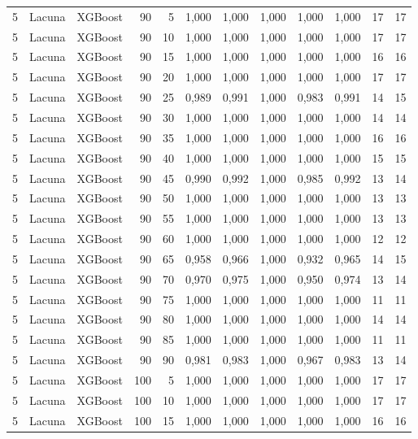 \begin{longtable}{@{}rllrrrrrrrrr@{}}
5 & Lacuna & XGBoost & 90 & 5 & 1,000 & 1,000 & 1,000 & 1,000 & 1,000 & 17 & 17 \\
5 & Lacuna & XGBoost & 90 & 10 & 1,000 & 1,000 & 1,000 & 1,000 & 1,000 & 17 & 17 \\
5 & Lacuna & XGBoost & 90 & 15 & 1,000 & 1,000 & 1,000 & 1,000 & 1,000 & 16 & 16 \\
5 & Lacuna & XGBoost & 90 & 20 & 1,000 & 1,000 & 1,000 & 1,000 & 1,000 & 17 & 17 \\
5 & Lacuna & XGBoost & 90 & 25 & 0,989 & 0,991 & 1,000 & 0,983 & 0,991 & 14 & 15 \\
5 & Lacuna & XGBoost & 90 & 30 & 1,000 & 1,000 & 1,000 & 1,000 & 1,000 & 14 & 14 \\
5 & Lacuna & XGBoost & 90 & 35 & 1,000 & 1,000 & 1,000 & 1,000 & 1,000 & 16 & 16 \\
5 & Lacuna & XGBoost & 90 & 40 & 1,000 & 1,000 & 1,000 & 1,000 & 1,000 & 15 & 15 \\
5 & Lacuna & XGBoost & 90 & 45 & 0,990 & 0,992 & 1,000 & 0,985 & 0,992 & 13 & 14 \\
5 & Lacuna & XGBoost & 90 & 50 & 1,000 & 1,000 & 1,000 & 1,000 & 1,000 & 13 & 13 \\
5 & Lacuna & XGBoost & 90 & 55 & 1,000 & 1,000 & 1,000 & 1,000 & 1,000 & 13 & 13 \\
5 & Lacuna & XGBoost & 90 & 60 & 1,000 & 1,000 & 1,000 & 1,000 & 1,000 & 12 & 12 \\
5 & Lacuna & XGBoost & 90 & 65 & 0,958 & 0,966 & 1,000 & 0,932 & 0,965 & 14 & 15 \\
5 & Lacuna & XGBoost & 90 & 70 & 0,970 & 0,975 & 1,000 & 0,950 & 0,974 & 13 & 14 \\
5 & Lacuna & XGBoost & 90 & 75 & 1,000 & 1,000 & 1,000 & 1,000 & 1,000 & 11 & 11 \\
5 & Lacuna & XGBoost & 90 & 80 & 1,000 & 1,000 & 1,000 & 1,000 & 1,000 & 14 & 14 \\
5 & Lacuna & XGBoost & 90 & 85 & 1,000 & 1,000 & 1,000 & 1,000 & 1,000 & 11 & 11 \\
5 & Lacuna & XGBoost & 90 & 90 & 0,981 & 0,983 & 1,000 & 0,967 & 0,983 & 13 & 14 \\
5 & Lacuna & XGBoost & 100 & 5 & 1,000 & 1,000 & 1,000 & 1,000 & 1,000 & 17 & 17 \\
5 & Lacuna & XGBoost & 100 & 10 & 1,000 & 1,000 & 1,000 & 1,000 & 1,000 & 17 & 17 \\
5 & Lacuna & XGBoost & 100 & 15 & 1,000 & 1,000 & 1,000 & 1,000 & 1,000 & 16 & 16 \\

\end{longtable}
